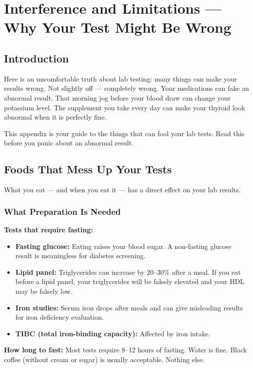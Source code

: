 \chapter{Interference and Limitations --- Why Your Test Might Be Wrong}
\label{app:interference}

\clearpage
\section{Introduction}

Here is an uncomfortable truth about lab testing: many things can make your results wrong. Not slightly off --- completely wrong. Your medications can fake an abnormal result. That morning jog before your blood draw can change your potassium level. The supplement you take every day can make your thyroid look abnormal when it is perfectly fine.

This appendix is your guide to the things that can fool your lab tests. Read this before you panic about an abnormal result.

\clearpage
\section{Foods That Mess Up Your Tests}

What you eat --- and when you eat it --- has a direct effect on your lab results.

\subsection{What Preparation Is Needed}

\textbf{Tests that require fasting:}
\begin{itemize}
    \item \textbf{Fasting glucose:} Eating raises your blood sugar. A non-fasting glucose result is meaningless for diabetes screening.
    \item \textbf{Lipid panel:} Triglycerides can increase by 20--30\% after a meal. If you eat before a lipid panel, your triglycerides will be falsely elevated and your HDL may be falsely low.
    \item \textbf{Iron studies:} Serum iron drops after meals and can give misleading results for iron deficiency evaluation.
    \item \textbf{TIBC (total iron-binding capacity):} Affected by iron intake.
\end{itemize}

\textbf{How long to fast:} Most tests require 8--12 hours of fasting. Water is fine. Black coffee (without cream or sugar) is usually acceptable. Nothing else.

